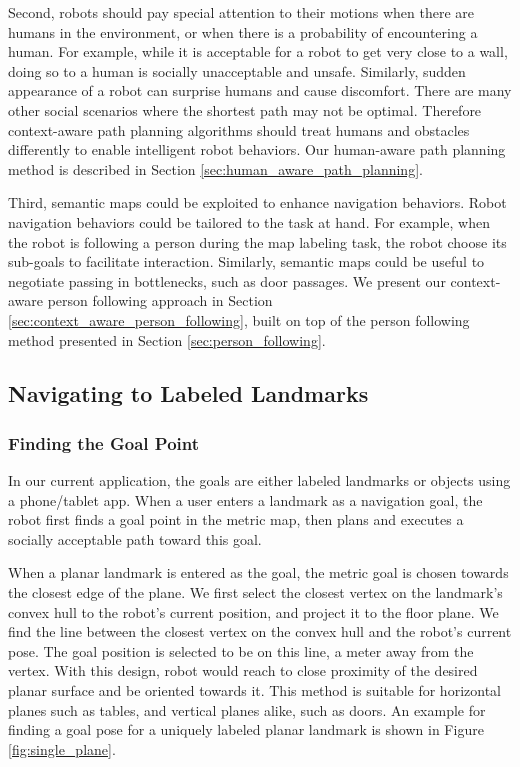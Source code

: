 \documentclass[3p]{elsarticle}
\begin{document}
Second, robots should pay special attention to their motions when there are humans in the environment, or when there is a probability of encountering a human. For example, while it is acceptable for a robot to get very close to a wall, doing so to a human is socially unacceptable and unsafe. Similarly, sudden appearance of a robot can surprise humans and cause discomfort. There are many other social scenarios where the shortest path may not be optimal. Therefore context-aware path planning algorithms should treat humans and obstacles differently to enable intelligent robot behaviors. Our human-aware path planning method is described in Section \ref{sec:human_aware_path_planning}.

Third, semantic maps could be exploited to enhance navigation behaviors. Robot navigation behaviors could be tailored to the task at hand. For example, when the robot is following a person during the map labeling task, the robot choose its sub-goals to facilitate interaction. Similarly, semantic maps could be useful to negotiate passing in bottlenecks, such as door passages. We present our context-aware person following approach in Section \ref{sec:context_aware_person_following}, built on top of the person following method presented in Section \ref{sec:person_following}.

\subsection{Navigating to Labeled Landmarks}
\label{sec:navigating_to_labeled_landmarks}

\subsubsection{Finding the Goal Point}
\label{sec:finding_the_goal_point}

In our current application, the goals are either labeled landmarks or objects using a phone/tablet app. When a user enters a landmark as a navigation goal, the robot first finds a goal point in the metric map, then plans and executes a socially acceptable path toward this goal.

When a planar landmark is entered as the goal, the metric goal is chosen towards the closest edge of the plane. We first select the closest vertex on the landmark's convex hull to the robot's current position, and project it to the floor plane. We find the line between the closest vertex on the convex hull and the robot's current pose. The goal position is selected to be on this line, a meter away from the vertex. With this design, robot would reach to close proximity of the desired planar surface and be oriented towards it. This method is suitable for horizontal planes such as tables, and vertical planes alike, such as doors. An example for finding a goal pose for a uniquely labeled planar landmark is shown in Figure \ref{fig:single_plane}.
\end{document}
